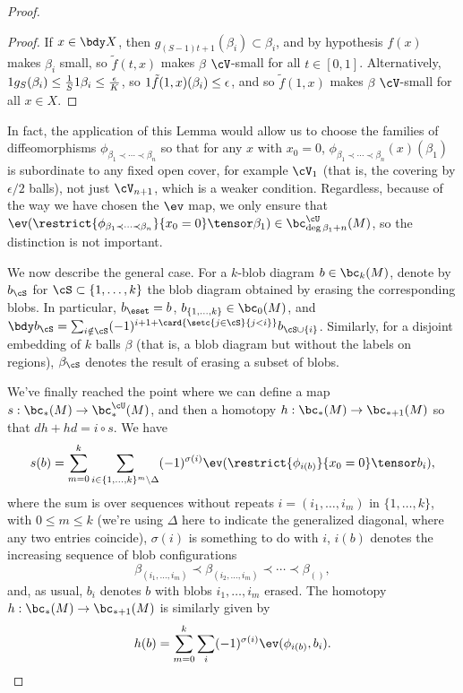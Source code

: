 \begin{proof}
\begin{proof}
If $x \in \bdy X$, then $g_{(S-1)t+1}(\beta_i) \subset \beta_i$, and by hypothesis $f(x)$ makes $\beta_i$ small, so $\tilde{f}(t, x)$ makes $\beta$ $\cV$-small for all $t \in [0,1]$. Alternatively, $1 g_S(\beta_i) \leq \frac{1}{S} 1 \beta_i \leq \frac{\epsilon}{K}$, so $1 \tilde{f}(1,x)(\beta_i) \leq \epsilon$, and so $\tilde{f}(1,x)$ makes $\beta$ $\cV$-small for all $x \in X$.
\end{proof}

In fact, the application of this Lemma would allow us to choose the families of diffeomorphisms $\phi_{\beta_1 \prec \cdots \prec \beta_n}$ so that for any $x$ with $x_0 = 0$, $\phi_{\beta_1 \prec \cdots \prec \beta_n}(x)(\beta_1)$ is subordinate to any fixed open cover, for example $\cV_1$ (that is, the covering by $\epsilon/2$ balls), not just $\cV_{n+1}$, which is a weaker condition. Regardless, because of the way we have chosen the $\ev$ map, we only ensure that $\ev(\restrict{\phi_{\beta_1 \prec \cdots \prec \beta_n}}{x_0 = 0} \tensor \beta_1) \in \bc_{\deg \beta_1 + n}^{\cU}(M)$, so the distinction is not important.

We now describe the general case. For a $k$-blob diagram $b \in \bc_k(M)$, denote by $b_\cS$ for $\cS \subset \{1, \ldots, k\}$ the blob diagram obtained by erasing the corresponding blobs. In particular, $b_\eset = b$, $b_{\{1,\ldots,k\}} \in \bc_0(M)$, and $\bdy b_\cS = \sum_{i \notin \cS} (-1)^{i+1+\card{\setc{j \in \cS}{j < i}}}  b_{\cS \cup \{i\}}$.
Similarly, for a disjoint embedding of $k$ balls $\beta$ (that is, a blob diagram but without the labels on regions), $\beta_\cS$ denotes the result of erasing a subset of blobs. 


\newcommand{\length}[1]{\operatorname{length}(#1)}

We've finally reached the point where we can define a map $s: \bc_*(M) \to \bc^{\cU}_*(M)$, and then a homotopy $h:\bc_*(M) \to \bc_{*+1}(M)$ so that $dh+hd=i\circ s$.  We have
$$s(b) = \sum_{m=0}^{k} \sum_{i \in \{1, \ldots, k\}^{m} \setminus \Delta} (-1)^{\sigma(i)}  \ev(\restrict{\phi_{i(b)}}{x_0 = 0} \tensor b_i),$$
where the sum is over sequences without repeats $i=(i_1,\ldots,i_m)$ in $\{1,\ldots,k\}$, with $0\leq m \leq k$ (we're using $\Delta$ here to indicate the generalized diagonal, where any two entries coincide), $\sigma(i)$ is something to do with $i$, $i(b)$ denotes the increasing sequence of blob configurations
$$\beta_{(i_1,\ldots,i_m)} \prec \beta_{(i_2,\ldots,i_m)} \prec \cdots \prec \beta_{()},$$
and, as usual, $b_i$ denotes $b$ with blobs $i_1, \ldots, i_m$ erased.
The homotopy $h:\bc_*(M) \to \bc_{*+1}(M)$ is similarly given by
$$h(b) = \sum_{m=0}^{k} \sum_{i} (-1)^{\sigma(i)} \ev(\phi_{i(b)}, b_i).$$


\end{proof}
